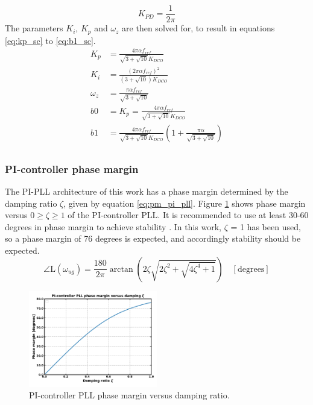 			\begin{equation}
				K_{PD} = \frac{1}{2\pi}
			\end{equation}
			The parameters $K_i$, $K_p$ and $\omega_z$ are then solved for, to result in equations \ref{eq:kp_sc} to \ref{eq:b1_sc}.
			\begin{align}
				K_p & = \frac{4\pi\alpha f_{ref}}{\sqrt{3+\sqrt{10}}K_{DCO}}\label{eq:kp_sc}\\
				K_i & = \frac{(2\pi\alpha f_{ref})^2}{(3+\sqrt{10})K_{DCO}}\\
				\omega_z &= \frac{\pi\alpha f_{ref}}{\sqrt{3+\sqrt{10}}}\label{eq:wz_sc}\\
				b0 &= K_p = \frac{4\pi\alpha f_{ref}}{\sqrt{3+\sqrt{10}}K_{DCO}}  \\
				b1 &= \frac{4\pi\alpha f_{ref}}{\sqrt{3+\sqrt{10}}K_{DCO}}\left( 1 + \frac{\pi\alpha}{\sqrt{3+\sqrt{10}}} \right ) \label{eq:b1_sc}\\
			\end{align}

		\subsubsection{PI-controller phase margin}\label{pi_phase_margin}
			The PI-PLL architecture of this work has a phase margin determined by the damping ratio $\zeta$, given by equation \ref{eq:pm_pi_pll}. Figure \ref{fig:phase_margin} shows phase margin versus $0 \geq \zeta \geq 1$ of the PI-controller PLL. It is recommended to use at least 30-60 degrees in phase margin to achieve stability \cite{ogata_2010_stability}. In this work, $\zeta$ = 1 has been used, so a phase margin of 76 degrees is expected, and accordingly stability should be expected.
			\begin{equation}\label{eq:pm_pi_pll}
				\angle \text{L}(\omega_{ug}) = \frac{180}{2\pi}\arctan\left(2\zeta\sqrt{2\zeta^2 + \sqrt{4\zeta^4+1}}\right)\hspace{1em}[\text{degrees}]
			\end{equation}
			\begin{figure}[htb!]
				\center\includegraphics[width=0.5\textwidth, angle=0]{figs/damping_vs_pm.pdf}
				\caption{PI-controller PLL phase margin versus damping ratio.}
				\label{fig:phase_margin}
			\end{figure}



